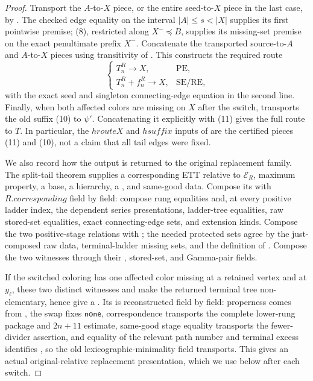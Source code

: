 \begin{proof}
Transport the \(A\)-to-\(X\) piece, or the entire seed-to-\(X\) piece in
the last case, by
.  The checked
edge equality on the interval \(|A|\leq s<|X|\) supplies its first
pointwise premise; (8), restricted along \(X^-\preccurlyeq B\), supplies
its missing-set premise on the exact penultimate prefix \(X^-\).  Concatenate
the transported source-to-\(A\) and \(A\)-to-\(X\) pieces using transitivity
of .  This constructs the required
route
\[
 \begin{cases}
 T_n^R\longrightarrow X,&\text{PE},\\
 T_n^R+f_n^R\longrightarrow X,&\text{SE/RE},
 \end{cases}                                                   \tag{11}
\]
with the exact seed and singleton connecting-edge equation in the second
line.  Finally, when both affected colors are missing on \(X\) after the
switch,  transports
the old suffix (10) to \(\psi'\).  Concatenating it explicitly with (11)
gives the full route to \(T\).  In particular, the \(hrouteX\) and
\(hsuffix\) inputs of  are the
certified pieces (11) and (10), not a claim that all tail edges were fixed.

We also record how the output is returned to the original replacement
family.  The split-tail theorem supplies a corresponding ETT relative to
\(\mathcal E_R\), maximum property, a base, a hierarchy, a
, and same-good data.  Compose its
 with
\(R.\mathit{corresponding}\) field by field: compose rung equalities and,
at every positive ladder index, the dependent series presentations,
ladder-tree equalities, raw stored-set equalities, exact connecting-edge
sets, and extension kinds.  Compose the two positive-stage
 relations with ; the needed protected
sets agree by the just-composed raw data, terminal-ladder missing sets, and
the definition of .  Compose the two
 witnesses through their
, stored-set, and Gamma-pair fields.

If the switched coloring has one affected color missing at a retained
vertex and at \(y_\ell\), these two distinct witnesses and
 make the returned terminal tree
non-elementary, hence give a .  Its
 is reconstructed field by
field: properness comes from , the
swap fixes \(\mathsf{none}\), correspondence transports the complete
lower-rung package and \(2n+11\) estimate, same-good stage equality
transports the fewer-divider assertion, and equality of the relevant path
number and terminal excess identifies
, so the old
lexicographic-minimality field transports.  This gives an actual
original-relative replacement presentation, which we use below after
each switch.


\end{proof}
